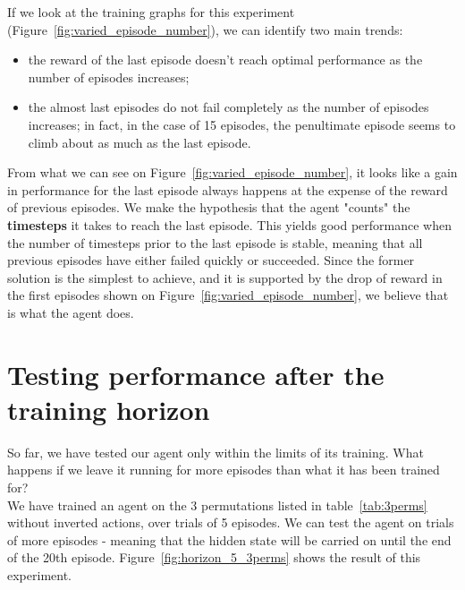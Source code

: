 If we look at the training graphs for this experiment 
(Figure~\ref{fig:varied_episode_number}), we can identify two main trends:
\begin{itemize}
	\item the reward of the last episode doesn't reach optimal performance
		as the number of episodes increases;
	\item the almost last episodes do not fail completely as the number of 
		episodes increases; in fact, in the case of 15 episodes, the
		penultimate episode seems to climb about as much as the last
		episode.
\end{itemize}

From what we can see on Figure~\ref{fig:varied_episode_number}, it looks like
a gain in performance for the last episode always happens at the expense of
the reward of previous episodes. We make the hypothesis that the agent
"counts" the \textbf{timesteps} it takes to reach the last episode. This yields good
performance when the number of timesteps prior to the last episode is stable, 
meaning that all previous episodes have either failed quickly or succeeded. Since
the former solution is the simplest to achieve, and it is supported by the 
drop of reward in the first episodes shown on 
Figure~\ref{fig:varied_episode_number}, we believe that is what the agent does.


\section{Testing performance after the training horizon}
So far, we have tested our agent only within the limits of its training.
What happens if we leave it running for more episodes than what it
has been trained for?\\

We have trained an agent on the 3 permutations listed in table~\ref{tab:3perms}
without inverted actions, over trials of 5 episodes.
We can test the agent on trials of more episodes - meaning that the hidden
state will be carried on until the end of the 20th episode.
Figure~\ref{fig:horizon_5_3perms} shows the result of this experiment.\\

